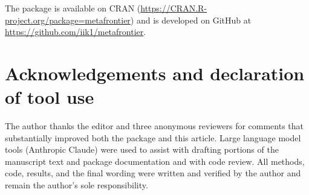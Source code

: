 The package is available on CRAN
(\url{https://CRAN.R-project.org/package=metafrontier}) and is developed
on GitHub at \url{https://github.com/iik1/metafrontier}.

\section*{Acknowledgements and declaration of tool use}\label{acknowledgements-and-declaration-of-tool-use}

The author thanks the editor and three anonymous reviewers for comments
that substantially improved both the package and this article. Large
language model tools (Anthropic Claude) were used to assist with drafting
portions of the manuscript text and package documentation and with code
review. All methods, code, results, and the final wording were written
and verified by the author and remain the author's sole responsibility.



\address{%
Erik Enstad\\
NHH Norwegian School of Economics\\%
Department of Business and Management Science\\ Bergen, Norway\\
%
%
\textit{ORCiD: \href{https://orcid.org/0009-0006-1053-3849}{0009-0006-1053-3849}}\\%
\href{mailto:erik.enstad@nhh.no}{\nolinkurl{erik.enstad@nhh.no}}%
}
